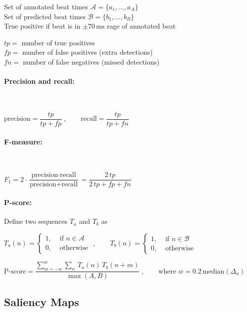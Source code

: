 \documentclass{scrartcl}
\begin{document}
Set of annotated beat times $\mathcal A = \{a_1, \dots, a_A\}$ \\
Set of predicted beat times $\mathcal B = \{b_1, \dots, b_B\}$ \\

True positive if beat is in $\pm 70\,\text{ms}$ rage of annotated beat

$tp =$ number of true positives \\
$fp =$ number of false positives (extra detections) \\
$fn =$ number of false negatives (missed detections) 

\paragraph{Precision and recall:} $ $

$\text{precision} = \dfrac{tp}{tp + fp}\;, \qquad \text{recall} = \dfrac{tp}{tp + fn}$


\paragraph{F-measure:} $ $

$F_1 = 2 \cdot \dfrac{\text{precision} \cdot \text{recall}}{\text{precision} + \text{recall}} = \dfrac{2\, tp}{2\, tp + fp + fn}$

\paragraph{P-score:} Define two sequences $T_a$ and $T_b$ as 

$T_a(n) = \begin{cases}
	1, &\text{ if } n \in \mathcal A \\
	0 , & \text{ otherwise }
\end{cases}, \qquad T_b(n) = \begin{cases}
	1, &\text{ if } n \in \mathcal B \\
	0 , & \text{ otherwise }
\end{cases}$

$\text{P-score} = \dfrac{\displaystyle \sum_{m=-w}^w  \sum_{n}\,  T_a(n)\,  T_b(n+m)}{\max(A,B)} \;, \qquad \text{where } w = 0.2 \, \text{median}(\Delta_a)$ 



\subsection{Saliency Maps}
\end{document}
